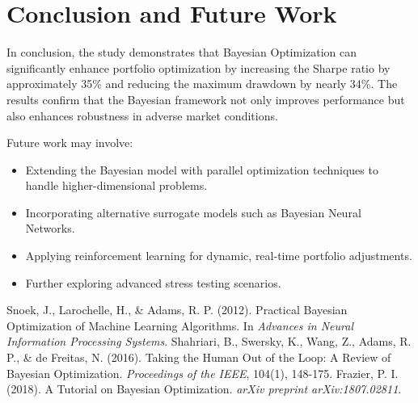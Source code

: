 \documentclass[a4paper,12pt]{article}
\begin{document}
\section{Conclusion and Future Work}
In conclusion, the study demonstrates that Bayesian Optimization can significantly enhance portfolio optimization by increasing the Sharpe ratio by approximately 35\% and reducing the maximum drawdown by nearly 34\%. The results confirm that the Bayesian framework not only improves performance but also enhances robustness in adverse market conditions.

Future work may involve:
\begin{itemize}
    \item Extending the Bayesian model with parallel optimization techniques to handle higher-dimensional problems.
    \item Incorporating alternative surrogate models such as Bayesian Neural Networks.
    \item Applying reinforcement learning for dynamic, real-time portfolio adjustments.
    \item Further exploring advanced stress testing scenarios.
\end{itemize}

\begin{thebibliography}{00}
 Snoek, J., Larochelle, H., \& Adams, R. P. (2012). Practical Bayesian Optimization of Machine Learning Algorithms. In \textit{Advances in Neural Information Processing Systems}.
 Shahriari, B., Swersky, K., Wang, Z., Adams, R. P., \& de Freitas, N. (2016). Taking the Human Out of the Loop: A Review of Bayesian Optimization. \textit{Proceedings of the IEEE}, 104(1), 148-175.
 Frazier, P. I. (2018). A Tutorial on Bayesian Optimization. \textit{arXiv preprint arXiv:1807.02811}.
\end{thebibliography}
\end{document}
